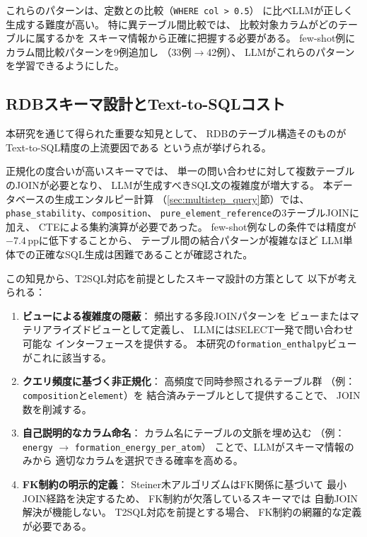 \documentclass[5p,twocolumn]{elsarticle}
\begin{document}
これらのパターンは、定数との比較（\texttt{WHERE col > 0.5}）
に比べLLMが正しく生成する難度が高い。
特に異テーブル間比較では、
比較対象カラムがどのテーブルに属するかを
スキーマ情報から正確に把握する必要がある。
few-shot例にカラム間比較パターンを9例追加し
（33例$\to$42例）、
LLMがこれらのパターンを学習できるようにした。

\subsection{RDBスキーマ設計とText-to-SQLコスト}
\label{sec:schema_design_cost}

本研究を通じて得られた重要な知見として、
RDBのテーブル構造そのものがText-to-SQL精度の上流要因である
という点が挙げられる。

正規化の度合いが高いスキーマでは、
単一の問い合わせに対して複数テーブルのJOINが必要となり、
LLMが生成すべきSQL文の複雑度が増大する。
本データベースの生成エンタルピー計算
（\ref{sec:multistep_query}節）では、
\texttt{phase\_stability}、\texttt{composition}、
\texttt{pure\_element\_reference}の3テーブルJOINに加え、
CTEによる集約演算が必要であった。
few-shot例なしの条件では精度が$-$7.4\,ppに低下することから、
テーブル間の結合パターンが複雑なほど
LLM単体での正確なSQL生成は困難であることが確認された。

この知見から、T2SQL対応を前提としたスキーマ設計の方策として
以下が考えられる：
\begin{enumerate}
  \item \textbf{ビューによる複雑度の隠蔽}：
    頻出する多段JOINパターンを
    ビューまたはマテリアライズドビューとして定義し、
    LLMにはSELECT一発で問い合わせ可能な
    インターフェースを提供する。
    本研究の\texttt{formation\_enthalpy}ビューがこれに該当する。
  \item \textbf{クエリ頻度に基づく非正規化}：
    高頻度で同時参照されるテーブル群
    （例：\texttt{composition}と\texttt{element}）を
    結合済みテーブルとして提供することで、
    JOIN数を削減する。
  \item \textbf{自己説明的なカラム命名}：
    カラム名にテーブルの文脈を埋め込む
    （例：\texttt{energy} $\to$ \texttt{formation\_energy\_per\_atom}）
    ことで、LLMがスキーマ情報のみから
    適切なカラムを選択できる確率を高める。
  \item \textbf{FK制約の明示的定義}：
    Steiner木アルゴリズムはFK関係に基づいて
    最小JOIN経路を決定するため、
    FK制約が欠落しているスキーマでは
    自動JOIN解決が機能しない。
    T2SQL対応を前提とする場合、
    FK制約の網羅的な定義が必要である。
\end{enumerate}
\end{document}

